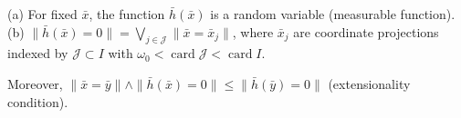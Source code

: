 (a) For fixed $\bar{x}$, the function $\bar{h}(\bar{x})$ is a random variable (measurable function).
(b) $\|\bar{h}(\bar{x}) = 0\| = \bigvee_{j \in \mathcal{J}} \|\bar{x} = \bar{x}_j\|$, where $\bar{x}_j$ are coordinate projections indexed by $\mathcal{J} \subset I$ with $\omega_0 < \operatorname{card} \mathcal{J} < \operatorname{card} I$.

Moreover, $\|\bar{x} = \bar{y}\| \wedge \|\bar{h}(\bar{x}) = 0\| \leqslant \|\bar{h}(\bar{y}) = 0\|$ (extensionality condition).